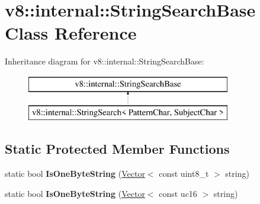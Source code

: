 \hypertarget{classv8_1_1internal_1_1_string_search_base}{}\section{v8\+:\+:internal\+:\+:String\+Search\+Base Class Reference}
\label{classv8_1_1internal_1_1_string_search_base}
Inheritance diagram for v8\+:\+:internal\+:\+:String\+Search\+Base\+:\begin{figure}[H]
\begin{center}
\leavevmode
\includegraphics[height=2.000000cm]{classv8_1_1internal_1_1_string_search_base}
\end{center}
\end{figure}
\subsection*{Static Protected Member Functions}
\begin{DoxyCompactItemize}
\item 
static bool {\bfseries Is\+One\+Byte\+String} (\hyperlink{classv8_1_1internal_1_1_vector}{Vector}$<$ const uint8\+\_\+t $>$ string)\hypertarget{classv8_1_1internal_1_1_string_search_base_afd945987a48941b841edfd8e6f5c47a8}{}\label{classv8_1_1internal_1_1_string_search_base_afd945987a48941b841edfd8e6f5c47a8}

\item 
static bool {\bfseries Is\+One\+Byte\+String} (\hyperlink{classv8_1_1internal_1_1_vector}{Vector}$<$ const uc16 $>$ string)\hypertarget{classv8_1_1internal_1_1_string_search_base_afe268149123840e06458df33d10bfafc}{}\label{classv8_1_1internal_1_1_string_search_base_afe268149123840e06458df33d10bfafc}

\end{DoxyCompactItemize}
